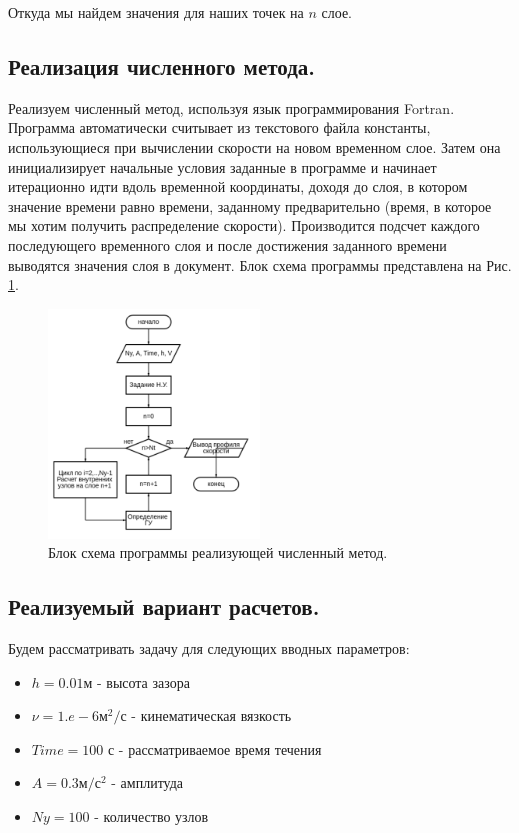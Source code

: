 Откуда мы найдем значения для наших точек на $n$ слое.


\subsection{Реализация численного метода.}
Реализуем численный метод, используя язык программирования Fortran. Программа автоматически считывает из текстового файла константы, использующиеся при вычислении скорости на новом временном слое.
Затем она инициализирует начальные условия заданные в программе и начинает итерационно идти вдоль временной координаты, доходя до слоя, в котором значение времени равно времени, заданному предварительно (время, в которое мы хотим получить распределение скорости).
Производится подсчет каждого последующего временного слоя и после достижения заданного времени выводятся значения слоя в документ. Блок схема программы представлена на Рис. \ref{fig:4}.

\begin{figure}[H]
    \centering
    \includegraphics[width=0.5\textwidth]{images/4.png}
    \caption {Блок схема программы реализующей численный метод.}
    \label{fig:4}
\end{figure}

\subsection{Реализуемый вариант расчетов.}
Будем рассматривать задачу для следующих вводных параметров:
\begin{itemize}
    \item $h=0.01$м - высота зазора
    \item $\nu = 1.e-6 \text{м}^2/\text{с}$  - кинематическая вязкость
    \item $Time = 100$ с - рассматриваемое время течения
    \item $A=0.3 \text{м}/\text{с}^2$ - амплитуда
    \item $Ny = 100$ - количество узлов
\end{itemize}

